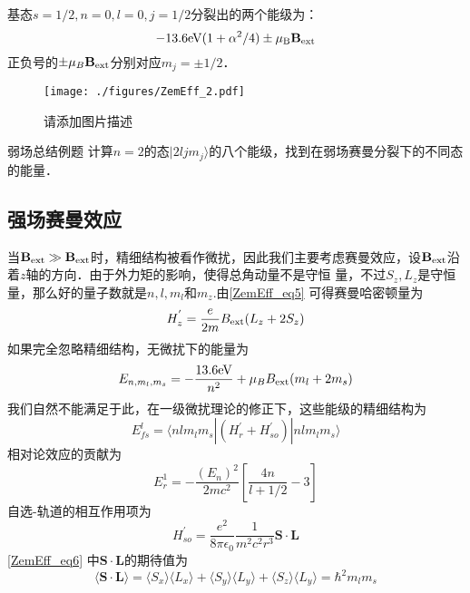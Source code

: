 \begin{example}{}
基态$s=1/2,n=0,l=0,j=1/2$分裂出的两个能级为：
\begin{equation}
-13.6\rm{eV}(1+\alpha^2/4)\pm\mu_B\mathbf{B}_{\rm{ext}}\notag
\end{equation}
正负号的$\pm\mu_B\mathbf{B}_{\rm{ext}}$分别对应$m_j=\pm1/2$．\begin{figure}[ht]
\centering
\texttt{[image: ./figures/ZemEff\_2.pdf]}
\caption{请添加图片描述} \label{ZemEff_fig2}
\end{figure}
\end{example}
\begin{example}{弱场总结例题}
计算$n=2$的态$|2ljm_j\rangle$的八个能级，找到在弱场赛曼分裂下的不同态的能量．
\end{example}
\subsection{强场赛曼效应}
当$\mathbf{B}_{\rm{ext}}\gg \mathbf{B}_{\rm{ext}}$时，精细结构被看作微扰，因此我们主要考虑赛曼效应，设$\mathbf{B}_{\rm{ext}}$沿着$z$轴的方向．由于外力矩的影响，使得总角动量不是守恒
量，不过$S_z,L_z$是守恒量，那么好的量子数就是$n,l,m_l$和$m_z$.由\autoref{ZemEff_eq5} 可得赛曼哈密顿量为
\begin{equation}\label{ZemEff_eq12}
H_z^{'} = \frac{e}{2m}B_{\rm{ext}}(L_z+2S_z)
\end{equation}
如果完全忽略精细结构，无微扰下的能量为
\begin{equation}\label{ZemEff_eq7}
E_{n,m_l,m_s}=-\frac{13.6\rm{eV}}{n^2}+\mu_B B_{\rm{ext}}(m_l+2m_s)
\end{equation}
我们自然不能满足于此，在一级微扰理论的修正下，这些能级的精细结构为
\begin{equation}\label{ZemEff_eq8}
E_{fs}^l=\langle nlm_lm_s|(H^{'}_r+H^{'}_{so})|nlm_lm_s\rangle
\end{equation}
相对论效应的贡献为
\begin{equation}\label{ZemEff_eq6}
E_r^1=-\frac{(E_n)^2}{2mc^2}\left[\frac{4n}{l+1/2}-3\right]
\end{equation}
自选-轨道的相互作用项为
\begin{equation}
H^{'}_{so}=\frac{e^2}{8\pi\epsilon_0}\frac{1}{m^2c^2r^3}\mathbf{S\cdot L}
\end{equation}
\autoref{ZemEff_eq6} 中$\mathbf{S\cdot L}$的期待值为
\begin{equation}
\langle \mathbf{S\cdot L} \rangle=\langle S_x\rangle\langle L_x\rangle+\langle S_y\rangle\langle L_y\rangle+\langle S_z\rangle\langle L_y\rangle=\hbar^2
m_lm_s\end{equation}
